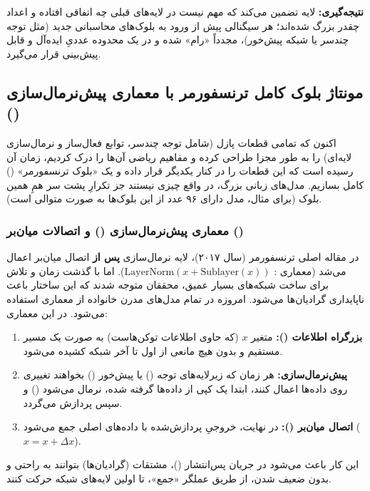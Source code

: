 \documentclass{article}
\begin{document}
\textbf{نتیجه‌گیری:} لایه  تضمین می‌کند که مهم نیست در لایه‌های قبلی چه اتفاقی افتاده و اعداد چقدر بزرگ شده‌اند؛ هر سیگنالی پیش از ورود به بلوک‌های محاسباتی جدید (مثل توجه چندسر یا شبکه پیش‌خور)، مجدداً «رام» شده و در یک محدوده عددیِ ایده‌آل و قابل پیش‌بینی قرار می‌گیرد.

\subsection{مونتاژ بلوک کامل ترنسفورمر با معماری پیش‌نرمال‌سازی ()}

اکنون که تمامی قطعات پازل (شامل توجه چندسر، توابع فعال‌ساز و نرمال‌سازی لایه‌ای) را به طور مجزا طراحی کرده و مفاهیم ریاضی آن‌ها را درک کردیم، زمان آن رسیده است که این قطعات را در کنار یکدیگر قرار داده و یک «بلوک ترنسفورمر» () کامل بسازیم. مدل‌های زبانی بزرگ، در واقع چیزی نیستند جز تکرارِ پشت سر همِ همین بلوک (برای مثال، مدل  دارای ۹۶ عدد از این بلوک‌ها به صورت متوالی است).

\subsubsection*{معماری پیش‌نرمال‌سازی () و اتصالات میان‌بر ()}

در مقاله اصلی ترنسفورمر (سال ۲۰۱۷)، لایه نرمال‌سازی \textbf{پس از} اتصال میان‌بر اعمال می‌شد (معماری : $\mathrm{LayerNorm}(x + \mathrm{Sublayer}(x))$). اما با گذشت زمان و تلاش برای ساخت شبکه‌های بسیار عمیق، محققان متوجه شدند که این ساختار باعث ناپایداری گرادیان‌ها می‌شود. 
امروزه در تمام مدل‌های مدرن خانواده  از معماری  استفاده می‌شود. در این معماری:
\begin{enumerate}
	\item \textbf{بزرگراه اطلاعات ():} متغیر $x$ (که حاوی اطلاعات توکن‌هاست) به صورت یک مسیر مستقیم و بدون هیچ مانعی از اول تا آخر شبکه کشیده می‌شود.
	\item \textbf{پیش‌نرمال‌سازی:} هر زمان که زیرلایه‌های توجه () یا پیش‌خور () بخواهند تغییری روی داده‌ها اعمال کنند، ابتدا یک کپی از داده‌ها گرفته شده، نرمال می‌شود () و سپس پردازش می‌گردد.
	\item \textbf{اتصال میان‌بر ():} در نهایت، خروجیِ پردازش‌شده با داده‌های اصلی جمع می‌شود ($x = x + \Delta x$).
\end{enumerate}
این کار باعث می‌شود در جریان پس‌انتشار ()، مشتقات (گرادیان‌ها) بتوانند به راحتی و بدون ضعیف شدن، از طریق عملگر «جمع»، تا اولین لایه‌های شبکه حرکت کنند.
\end{document}
